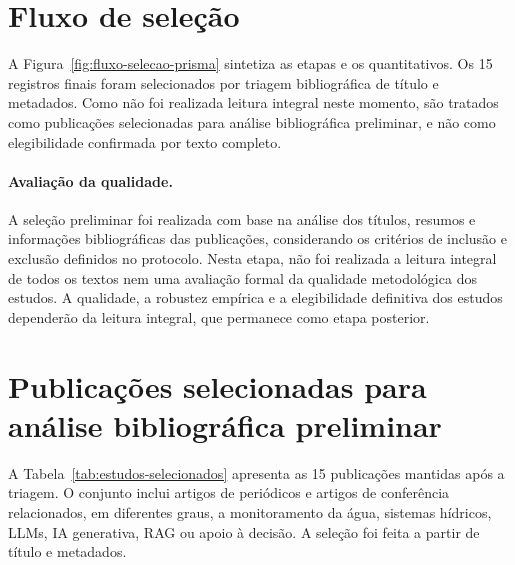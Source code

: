 \section{Fluxo de seleção}

A Figura~\ref{fig:fluxo-selecao-prisma} sintetiza as etapas e os quantitativos. Os 15 registros finais foram selecionados por triagem bibliográfica de título e metadados. Como não foi realizada leitura integral neste momento, são tratados como publicações selecionadas para análise bibliográfica preliminar, e não como elegibilidade confirmada por texto completo.



\paragraph{Avaliação da qualidade.}

A seleção preliminar foi realizada com base na análise dos títulos, resumos e informações bibliográficas das publicações, considerando os critérios de inclusão e exclusão definidos no protocolo. Nesta etapa, não foi realizada a leitura integral de todos os textos nem uma avaliação formal da qualidade metodológica dos estudos. 
A qualidade, a robustez empírica e a elegibilidade definitiva dos estudos dependerão da leitura integral, que permanece como etapa posterior.

\section{Publicações selecionadas para análise bibliográfica preliminar}

A Tabela~\ref{tab:estudos-selecionados} apresenta as 15 publicações mantidas após a triagem. O conjunto inclui artigos de periódicos e artigos de conferência relacionados, em diferentes graus, a monitoramento da água, sistemas hídricos, LLMs, IA generativa, RAG ou apoio à decisão. A seleção foi feita a partir de título e metadados.

